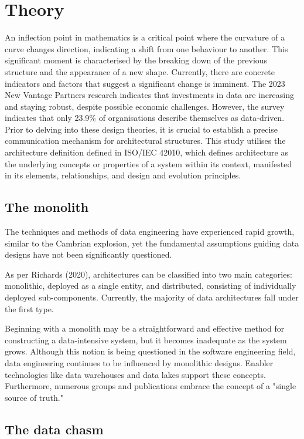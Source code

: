 \documentclass[journal]{IEEEtran}
\begin{document}
\section{Theory}
\label{sec:theory}

An inflection point in mathematics is a critical point where the curvature of a curve changes direction, indicating a shift from one behaviour to another. This significant moment is characterised by the breaking down of the previous structure and the appearance of a new shape. Currently, there are concrete indicators and factors that suggest a significant change is imminent. The 2023 New Vantage Partners research indicates that investments in data are increasing and staying robust, despite possible economic challenges. However, the survey indicates that only 23.9\% of organisations describe themselves as data-driven. Prior to delving into these design theories, it is crucial to establish a precise communication mechanism for architectural structures. This study utilises the architecture definition defined in ISO/IEC 42010, which defines architecture as the underlying concepts or properties of a system within its context, manifested in its elements, relationships, and design and evolution principles.

\subsection{The monolith}

The techniques and methods of data engineering have experienced rapid growth, similar to the Cambrian explosion, yet the fundamental assumptions guiding data designs have not been significantly questioned.

As per Richards (2020), architectures can be classified into two main categories: monolithic, deployed as a single entity, and distributed, consisting of individually deployed sub-components. Currently, the majority of data architectures fall under the first type. 

Beginning with a monolith may be a straightforward and effective method for constructing a data-intensive system, but it becomes inadequate as the system grows. Although this notion is being questioned in the software engineering field, data engineering continues to be influenced by monolithic designs. Enabler technologies like data warehouses and data lakes support these concepts. Furthermore, numerous groups and publications embrace the concept of a "single source of truth."

\subsection{The data chasm}
\end{document}
